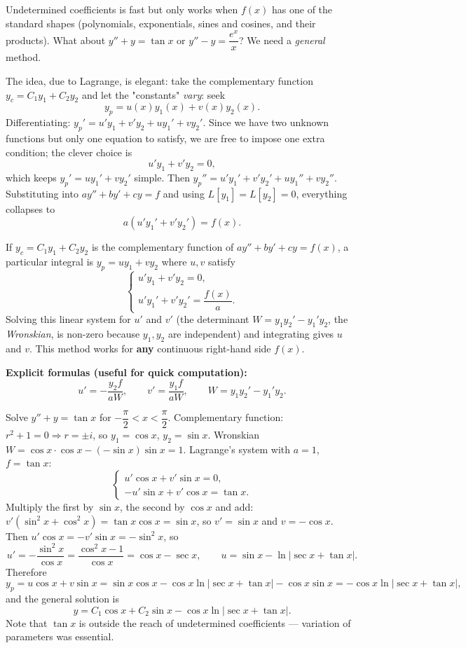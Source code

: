 \documentclass[11pt]{article}
\newcounter{popsec}
\newcounter{popsub}
\newcommand{\courssub}[1]{%
  \stepcounter{popsub}%
  \par\vspace{9pt}\noindent{\popxbold\fontsize{11.5}{13}\selectfont\color{popink}{\color{poporange}\thepopsec.\thepopsub}\hspace{6pt}#1}\par\nopagebreak\vspace{4pt}
}
\begin{document}
\courssub{Variation of Parameters}

Undetermined coefficients is fast but only works when $f(x)$ has one of the standard shapes (polynomials, exponentials, sines and cosines, and their products). What about $y''+y=\tan x$ or $y''-y=\dfrac{e^{x}}{x}$? We need a \emph{general} method.

The idea, due to Lagrange, is elegant: take the complementary function $y_{c}=C_{1}y_{1}+C_{2}y_{2}$ and let the "constants" \emph{vary}: seek
\[ y_{p}=u(x)y_{1}(x)+v(x)y_{2}(x). \]
Differentiating: $y_{p}'=u'y_{1}+v'y_{2}+uy_{1}'+vy_{2}'$. Since we have two unknown functions but only one equation to satisfy, we are free to impose one extra condition; the clever choice is
\[ u'y_{1}+v'y_{2}=0, \]
which keeps $y_{p}'=uy_{1}'+vy_{2}'$ simple. Then $y_{p}''=u'y_{1}'+v'y_{2}'+uy_{1}''+vy_{2}''$. Substituting into $ay''+by'+cy=f$ and using $L[y_{1}]=L[y_{2}]=0$, everything collapses to
\[ a(u'y_{1}'+v'y_{2}')=f(x). \]

\begin{propriete}
If $y_{c}=C_{1}y_{1}+C_{2}y_{2}$ is the complementary function of $ay''+by'+cy=f(x)$, a particular integral is $y_{p}=uy_{1}+vy_{2}$ where $u,v$ satisfy
\[ \begin{cases} u'y_{1}+v'y_{2}=0,\\[2pt] u'y_{1}'+v'y_{2}'=\dfrac{f(x)}{a}. \end{cases} \]
Solving this linear system for $u'$ and $v'$ (the determinant $W=y_{1}y_{2}'-y_{1}'y_{2}$, the \emph{Wronskian}, is non-zero because $y_{1},y_{2}$ are independent) and integrating gives $u$ and $v$. This method works for \textbf{any} continuous right-hand side $f(x)$.
\end{propriete}

\textbf{Explicit formulas (useful for quick computation):}
\[ u' = -\frac{y_{2}f}{aW}, \qquad v' = \frac{y_{1}f}{aW}, \qquad W = y_{1}y_{2}'-y_{1}'y_{2}. \]

\begin{exoresolu}
Solve $y''+y=\tan x$ for $-\dfrac{\pi}{2}<x<\dfrac{\pi}{2}$.
\tcblower
Complementary function: $r^{2}+1=0\Rightarrow r=\pm i$, so $y_{1}=\cos x$, $y_{2}=\sin x$. Wronskian $W=\cos x\cdot\cos x - (-\sin x)\sin x = 1$.
Lagrange's system with $a=1$, $f=\tan x$:
\[ \begin{cases} u'\cos x+v'\sin x=0,\\ -u'\sin x+v'\cos x=\tan x. \end{cases} \]
Multiply the first by $\sin x$, the second by $\cos x$ and add: $v'(\sin^{2}x+\cos^{2}x)=\tan x\cos x=\sin x$, so $v'=\sin x$ and $v=-\cos x$.
Then $u'\cos x=-v'\sin x=-\sin^{2}x$, so
\[ u'=-\dfrac{\sin^{2}x}{\cos x}=\dfrac{\cos^{2}x-1}{\cos x}=\cos x-\sec x, \qquad u=\sin x-\ln|\sec x+\tan x|. \]
Therefore
\[ y_{p}=u\cos x+v\sin x=\sin x\cos x-\cos x\ln|\sec x+\tan x|-\cos x\sin x=-\cos x\ln|\sec x+\tan x|, \]
and the general solution is
\[ y=C_{1}\cos x+C_{2}\sin x-\cos x\ln|\sec x+\tan x|. \]
Note that $\tan x$ is outside the reach of undetermined coefficients — variation of parameters was essential.
\end{exoresolu}
\end{document}
